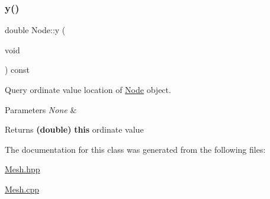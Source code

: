 \subsubsection{\texorpdfstring{y()}{y()}}
{\footnotesize\ttfamily double Node\+::y (\begin{DoxyParamCaption}\item[{void}]{ }\end{DoxyParamCaption}) const\hspace{0.3cm}{\ttfamily [inline]}}



Query ordinate value location of \mbox{\hyperlink{class_node}{Node}} object. 


\begin{DoxyParams}{Parameters}
{\em None} & \\
\hline
\end{DoxyParams}
\begin{DoxyReturn}{Returns}
{\bfseries (double)} {\bfseries this} ordinate value 
\end{DoxyReturn}


The documentation for this class was generated from the following files\+:\begin{DoxyCompactItemize}
\item 
\mbox{\hyperlink{_mesh_8hpp}{Mesh.\+hpp}}\item 
\mbox{\hyperlink{_mesh_8cpp}{Mesh.\+cpp}}\end{DoxyCompactItemize}
